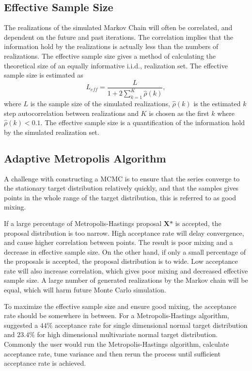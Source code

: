 \subsection{Effective Sample Size}
The realizations of the simulated Markov Chain will often be correlated, and dependent on the future and past iterations. The correlation implies that the information hold by the realizations is actually less than the numbers of realizations. The effective sample size gives a method of calculating the theoretical size of an equally informative i.i.d., realization set. The effective sample size is estimated as
\begin{equation}
L_{eff}=\frac{L}{1+2\sum_{k=1}^{K}\hat{\rho}(k)},
\end{equation}
where $L$ is the sample size of the simulated realizations, $\hat{\rho}(k)$ is the estimated $k$ step autocorrelation between realizations and $K$ is chosen as the first $k$ where $\hat{\rho}(k)<0.1$.
The effective sample size is a quantification of the information hold by the simulated realization set.

\subsection{Adaptive Metropolis Algorithm}
\label{ch:ama}
A challenge with constructing a MCMC is to ensure that the series converge to the stationary target distribution relatively quickly, and that the samples gives points in the whole range of the target distribution, this is referred to as good mixing.

If a large percentage of Metropolis-Hastings proposal $\boldsymbol{X}\mbox{*}$ is accepted, the proposal distribution is too narrow. High acceptance rate will delay convergence, and cause higher correlation between points. The result is poor mixing and a decrease in effective sample size.
On the other hand, if only a small percentage of the proposals is accepted, the proposal distribution is to wide. Low acceptance rate will also increase correlation, which gives poor mixing and decreased effective sample size. A large number of generated realizations by the Markov chain will be equal, which will harm future Monte Carlo simulation.

To maximize the effective sample size and ensure good mixing, the acceptance rate should be somewhere in between. For a Metropolis-Hastings algorithm, \cite{AccRate} suggested a $44\%$ acceptance rate for single dimensional normal target distribution and $23.4\%$ for high dimensional multivariate normal target distribution. 
Commonly the user would run the Metropolis-Hastings algorithm, calculate acceptance rate, tune variance and then rerun the process until sufficient acceptance rate is achieved. 

